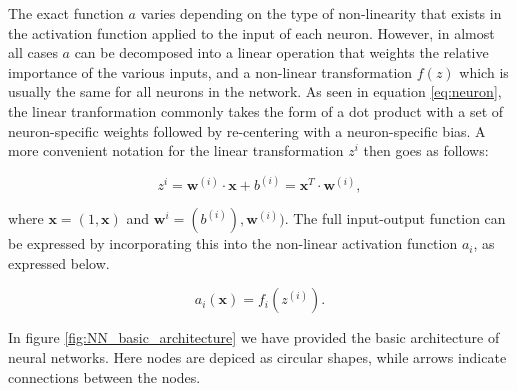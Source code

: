 \documentclass[a4paper, UKenglish, 11pt]{uiomaster}
\begin{document}
The exact function $a$ varies depending on the type of non-linearity that exists in the activation function applied to the input of each neuron. However, in almost all cases $a$ can be decomposed into a linear operation that weights the relative importance of the various inputs, and a non-linear transformation $f(z)$ which is usually the same for all neurons in the network. As seen in equation \ref{eq:neuron}, the linear tranformation commonly takes the form of a dot product with a set of neuron-specific weights followed by re-centering with a neuron-specific bias. A more convenient notation for the linear transformation $z^{i}$ then goes as follows:

\begin{equation}
z^{i} = \boldsymbol{w}^{(i)} \cdot \boldsymbol{x} + b^{(i)} = \mathbf{x}^T \cdot \mathbf{w}^{(i)} ,
\label{eq:linear_transformation}
\end{equation}


where $\mathbf{x} = (1, \boldsymbol{x})$ and $\mathbf{w}^i = (b^{(i)}), \boldsymbol{w}^{(i)})$. The full input-output function can be expressed by incorporating this into the non-linear activation function $a_i$, as expressed below.

\begin{equation}
a_i(\mathbf{x}) = f_i(z^{(i)}) .
\label{eq:linear_transformation}
\end{equation}

In figure \ref{fig:NN_basic_architecture} we have provided the basic architecture of neural networks. Here nodes are depiced as circular shapes, while arrows indicate connections between the nodes.
\end{document}
